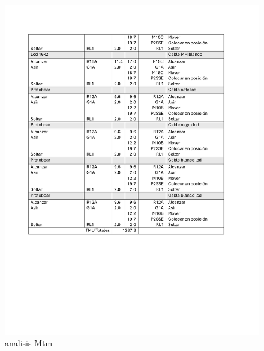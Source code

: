 \begin{figure}[H]
        \centering
        \includegraphics[scale=0.21]{13/img/analisMtmTres.pdf}
        \caption{analisis Mtm}
        \label{fig:analisis Mtm}
    \end{figure}
